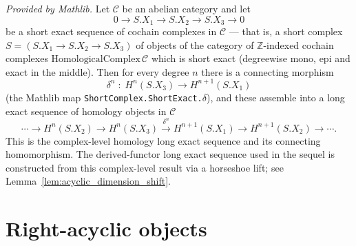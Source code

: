 \begin{lemma}
  \label{lem:homology_long_exact_sequence}
  \mathlibok
  \textit{Provided by Mathlib.}
  Let \(\mathcal{C}\) be an abelian category and let
  \[
    0 \longrightarrow S.X_1 \longrightarrow S.X_2 \longrightarrow S.X_3
      \longrightarrow 0
  \]
  be a short exact sequence of cochain complexes in \(\mathcal{C}\) --- that is, a
  short complex \(S = (S.X_1 \to S.X_2 \to S.X_3)\) of objects of the category of
  \(\mathbb{Z}\)-indexed cochain complexes \(\mathrm{HomologicalComplex}\,\mathcal{C}\)
  which is short exact (degreewise mono, epi and exact in the middle). Then for every
  degree \(n\) there is a connecting morphism
  \[
    \delta^n \;:\; H^n(S.X_3) \longrightarrow H^{n+1}(S.X_1)
  \]
  (the Mathlib map \texttt{ShortComplex.ShortExact.\(\delta\)}), and these assemble
  into a long exact sequence of homology objects in \(\mathcal{C}\)
  \[
    \cdots \longrightarrow H^n(S.X_2) \longrightarrow H^n(S.X_3)
      \xrightarrow{\ \delta^n\ } H^{n+1}(S.X_1)
      \longrightarrow H^{n+1}(S.X_2) \longrightarrow \cdots .
  \]
  This is the complex-level homology long exact sequence and its connecting
  homomorphism. The derived-functor long exact sequence used in the sequel is
  constructed from this complex-level result via a horseshoe lift; see
  Lemma~\ref{lem:acyclic_dimension_shift}.
\end{lemma}

\section{Right-acyclic objects}

